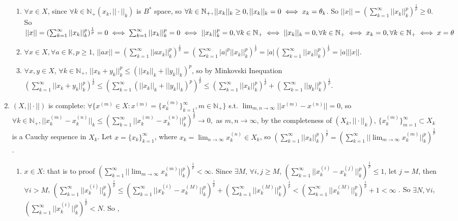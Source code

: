 \documentclass{ctexart}
\begin{document}
\begin{solution}
\begin{enumerate}
        \begin{enumerate}
            \item $\forall x\in X$, since $\forall k\in \mathbb{N}_+(x_k, ||\cdot||_k)$ is $B^*$ space, so $\forall k\in \mathbb{N}_+, ||x_k||_k\geq0, ||x_k||_k=0\iff x_k=\theta_k$. So $||x||=(\sum_{k=1}^{\infty}||x_k||_k^p)^{\frac{1}{p}}\geq0$. So $||x||=(\sum_{k=1}^{\infty}||x_k||_k^p)^{\frac{1}{p}}=0\iff \sum_{k=1}^{\infty}||x_k||_k^p=0\iff ||x_k||_k^p=0, \forall k\in \mathbb{N}_+\iff ||x_k||_k=0, \forall k\in \mathbb{N}_+\iff x_k=0, \forall k\in \mathbb{N}_+\iff x=\theta$
            \item $\forall x\in X, \forall a\in \mathbb{K}, p\geq1$, $||ax||=(\sum_{k=1}^{\infty}||ax_k||_k^p)^{\frac{1}{p}}=(\sum_{k=1}^{\infty}|a|^p||x_k||_k^p)^{\frac{1}{p}}=|a|(\sum_{k=1}^{\infty}||x_k||_k^p)^{\frac{1}{p}}=|a|||x||$.
            \item $\forall x, y\in X$, $\forall k\in \mathbb{N}_+$, $||x_k+y_k||_k^p\leq (||x_k||_k+||y_k||_k)^p$, so by Minkovski Inequation $(\sum_{k=1}^{\infty}||x_k+y_k||_k^p)^{\frac{1}{p}}\leq(\sum_{k=1}^{\infty}(||x_k||_k+||y_k||_k)^p)^{\frac{1}{p}}\leq (\sum_{k=1}^{\infty}||x_k||_k^p)^{\frac{1}{p}}+(\sum_{k=1}^{\infty}||y_k||_k^p)^{\frac{1}{p}}$.
        \end{enumerate}
        \item $(X, ||\cdot||)$ is complete: $\forall \{x^{(m)}\in X: x^{(m)}=\{x^{(m)}_k\}_{k=1}^{\infty}, m\in \mathbb{N}_+\}$ s.t. $\lim_{m,n\to\infty}||x^{(m)}-x^{(n)}||=0$, so $\forall k\in \mathbb{N}_+, ||x^{(m)}_k-x^{(n)}_k||_k\leq (\sum_{k=1}^{\infty}||x^{(m)}_k-x^{(n)}_k||_k^p)^{\frac{1}{p}}\to0,$ as $m,n\to\infty$, by the completeness of $(X_k, ||\cdot||_k)$, $\{x^{(m)}_k\}_{m=1}^{\infty}\subset X_k$ is a Cauchy sequence in $X_k$. Let $x=\{x_k\}_{k=1}^{\infty}$, where $x_k=\lim_{n\to\infty} x_k^{(n)}\in X_k$, so $(\sum_{k=1}^{\infty}||x_k||_k^p)^{\frac{1}{p}}=(\sum_{k=1}^{\infty}||\lim_{m\to\infty} x^{(m)}_k||_k^p)^{\frac{1}{p}}$.
        \begin{enumerate}
            \item $x\in X$: that is to proof $(\sum_{k=1}^{\infty}||\lim_{m\to\infty}x^{(m)}_k||_k^p)^{\frac{1}{p}}<\infty$. Since $\exists M$, $\forall i,j \geq M$, $(\sum_{k=1}^{\infty}||x^{(i)}_k-x^{(j)}_k||_k^p)^{\frac{1}{p}}\leq 1$, let $j=M$, then $\forall i>M$, $(\sum_{k=1}^{\infty}||x^{(i)}_k||_k^p)^{\frac{1}{p}}\leq(\sum_{k=1}^{\infty}||x^{(i)}_k-x^{(M)}_k||_k^p)^{\frac{1}{p}}+(\sum_{k=1}^{\infty}||x^{(M)}_k||_k^p)^{\frac{1}{p}}<(\sum_{k=1}^{\infty}||x^{(M)}_k||_k^p)^{\frac{1}{p}}+1<\infty$ . So $\exists N, \forall i$, $(\sum_{k=1}^{\infty}||x^{(i)}_k||_k^p)^{\frac{1}{p}}<N$. So , 

\end{enumerate}
\end{enumerate}
\end{solution}
\end{document}
